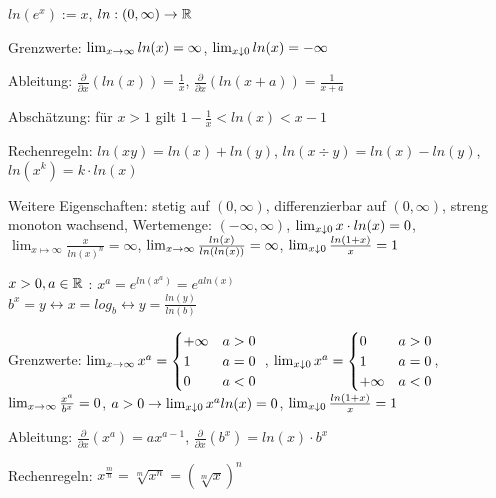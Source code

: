 \begin{definition}[Logarithmusfunktion]
	$ln(e^x) := x$, $ln : (0, \infty) \rightarrow \mathbb{R}$
	
	\begin{description} [noitemsep]
		\item Grenzwerte: $\lim_{x \rightarrow \infty} ln (x) = \infty$, $\lim_{x \downarrow 0} ln (x )= - \infty$
		\item Ableitung: $\frac{\partial}{\partial x} (ln(x)) = \frac{1}{x}$, $\frac{\partial}{\partial x} (ln(x + a)) = \frac{1}{x + a}$
		\item Abschätzung: für $x > 1$ gilt $1 - \frac{1}{x} < ln(x) < x - 1$
		\item Rechenregeln: $ln(xy) = ln(x) + ln(y)$, $ln(x \div y) = ln(x) - ln(y)$, $ln(x^k) = k \cdot ln(x)$
		\item Weitere Eigenschaften: stetig auf $(0,\infty)$, differenzierbar auf $(0,\infty)$, streng monoton wachsend, Wertemenge: $(- \infty, \infty)$, $\lim_{x \downarrow 0} x \cdot ln(x) = 0$, $\lim_{x \mapsto \infty} \frac{x}{ln(x)^n} = \infty$,  $\lim_{x \rightarrow \infty} \frac{ln(x)}{ln(ln(x))} = \infty$,  $\lim_{x \downarrow 0} \frac{ln(1+x)}{x} = 1$
	\end{description}
\end{definition}

\begin{definition}
 $\medspace$	\\ $x > 0, a \in \mathbb{R}$ : $x^a = e^{ln(x^a)} = e^{a ln(x)}$ \\ $b^x = y \leftrightarrow x = log_b \leftrightarrow y = \frac{ln (y)}{ln(b)}$
	\begin{description} [noitemsep]
		\item Grenzwerte: $\lim_{x \rightarrow \infty} x^a = \begin{cases}
		+ \infty & a > 0 \\ 
		1        & a = 0  \\
		0        & a < 0
		\end{cases} \medspace \medspace $,
		$\lim_{x \downarrow 0} x^a = \begin{cases}
		0        & a > 0 \\ 
		1        & a = 0  \\
		+ \infty & a < 0
		\end{cases}$,\\
		 $\lim_{x \rightarrow \infty} \frac{x^a}{b^x} = 0$, $a > 0 \rightarrow \lim_{x \downarrow 0} x^a ln(x) = 0$, $\lim_{x \downarrow 0} \frac{ln(1+x)}{x} = 1$
		\item Ableitung: $\frac{\partial}{\partial x} (x^a) = a x^{a - 1}$, $\frac{\partial}{\partial x}(b^x) = ln(x) \cdot b^x$
		\item Rechenregeln: $x^{\frac{m}{n}} = \sqrt[m]{x^n} = (\sqrt[m]{x})^n$
	\end{description}
\end{definition}


